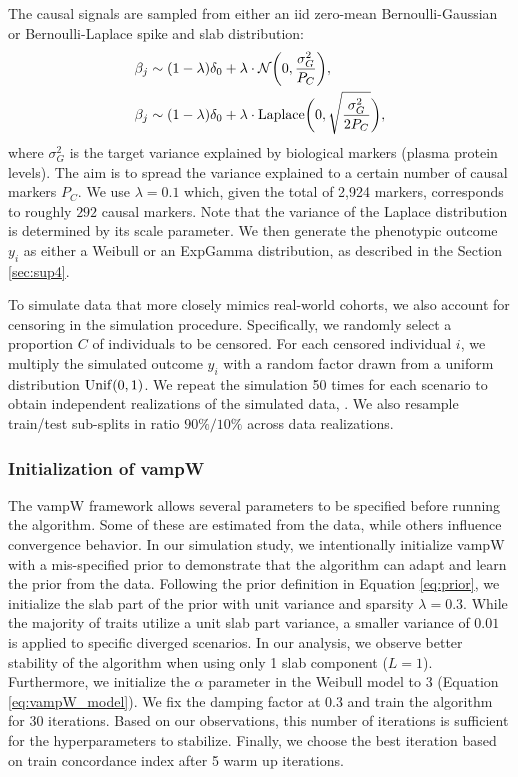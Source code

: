 The causal signals are sampled from either an \gls{iid} zero-mean Bernoulli-Gaussian or Bernoulli-Laplace spike and slab distribution:
\begin{align}
    & \beta_j \sim ( 1 - \lambda ) \delta_0 + \lambda \cdot \mathcal{N} \bigg (0, \frac{\sigma^2_G}{P_C} \bigg ), \\
    & \beta_j \sim ( 1 - \lambda ) \delta_0 + \lambda  \cdot {\rm Laplace} \bigg (0, \sqrt{\frac{\sigma_G^2}{2P_C}} \bigg ),
    \label{eq:sim_prior}
\end{align}
where $\sigma^2_G$ is the target variance explained by biological markers (plasma protein levels). The aim is to spread the variance explained to a certain number of causal markers $P_{C}$. We use $\lambda=0.1$ which, given the total of 2,924 markers, corresponds to roughly $292$ causal markers. Note that the variance of the Laplace distribution is determined by its scale parameter. We then generate the phenotypic outcome $y_i$ as either a Weibull or an ExpGamma distribution, as described in the Section \ref{sec:sup4}.

To simulate data that more closely mimics real-world cohorts, we also account for censoring in the simulation procedure. Specifically, we randomly select a proportion $C$ of individuals to be censored. For each censored individual $i$, we multiply the simulated outcome $y_i$ with a random factor drawn from a uniform distribution ${\rm Unif}(0,1)$. We repeat the simulation 50 times for each scenario to obtain independent realizations of the simulated data, . We also resample train/test sub-splits in ratio $90\%/10\%$ across data realizations.

\subsubsection{Initialization of vampW}
The vampW framework allows several parameters to be specified before running the algorithm. Some of these are estimated from the data, while others influence convergence behavior. In our simulation study, we intentionally initialize vampW with a mis-specified prior to demonstrate that the algorithm can adapt and learn the prior from the data. Following the prior definition in Equation \eqref{eq:prior}, we initialize the slab part of the prior with unit variance and sparsity $\lambda=0.3$. While the majority of traits utilize a unit slab part variance, a smaller variance of $0.01$ is applied to specific diverged scenarios. In our analysis, we observe better stability of the algorithm when using only 1 slab component ($L=1$). Furthermore, we initialize the $\alpha$ parameter in the Weibull model to 3 (Equation \ref{eq:vampW_model}). We fix the damping factor at 0.3 and train the algorithm for 30 iterations. Based on our observations, this number of iterations is sufficient for the hyperparameters to stabilize. Finally, we choose the best iteration based on train concordance index after 5 warm up iterations.

